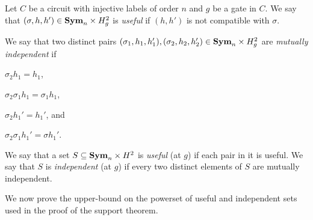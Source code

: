 \documentclass[../paper.tex]{subfiles}
\begin{document}




\begin{definition}
  Let $C$ be a circuit with injective labels of order $n$ and $g$ be a gate in
  $C$. We say that $(\sigma, h, h') \in \text{\textbf{Sym}}_n \times H^2_g$ is \emph{useful} if
  $(h, h')$ is not compatible with $\sigma$.

  We say that two distinct pairs $(\sigma_1, h_1, h_1'), (\sigma_2, h_2, h_2')
  \in \text{\textbf{Sym}}_n\times H^2_g$ are \emph{mutually independent} if
  \begin{myitemize}
  \item $\sigma_2 h_1 = h_1$,
  \item $\sigma_2 \sigma_1 h_1 = \sigma_1 h_1$,
  \item $\sigma_2 h_1' = h_1'$, and
  \item $\sigma_2 \sigma_1 h_1' = \sigma h_1'$.
  \end{myitemize}
  We say that a set $S \subseteq \text{\textbf{Sym}}_n \times H^2$ is \emph{useful} (at $g$) if
  each pair in it is useful. We say that $S$ is \emph{independent} (at $g$) if
  every two distinct elements of $S$ are mutually independent.
\end{definition}

We now prove the upper-bound on the powerset of useful and independent sets used
in the proof of the support theorem.
\end{document}
